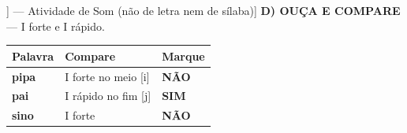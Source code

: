 \begin{exercicio}[Som /j/ [[j]] --- Atividade de Som (não de letra nem de sílaba)]
\textbf{D) OUÇA E COMPARE} --- I forte e I rápido.

\begin{center}
\begin{tabular}{@{}p{4.2cm}p{6.2cm}p{1.6cm}@{}}
\hline
\textbf{Palavra} & \textbf{Compare} & \textbf{Marque} \\
\hline
\textbf{pipa} & I forte no meio [i] & \textbf{NÃO} \\
\textbf{pai} & I rápido no fim [j] & \textbf{SIM} \\
\textbf{sino} & I forte & \textbf{NÃO} \\
\hline
\end{tabular}
\end{center}

\end{exercicio}

